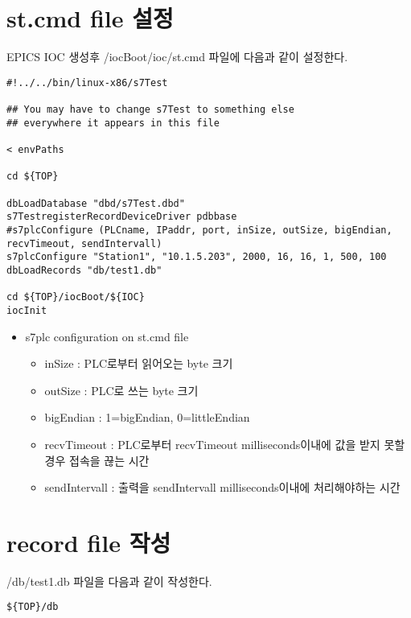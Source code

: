 \documentclass[11pt
  , a4paper
  , article
  , oneside
]{memoir}
\begin{document}
\section{st.cmd file 설정}
EPICS IOC 생성후 /iocBoot/ioc/st.cmd 파일에 다음과 같이 설정한다.

\begin{lstlisting}[style=termstyle]
#!../../bin/linux-x86/s7Test

## You may have to change s7Test to something else
## everywhere it appears in this file

< envPaths

cd ${TOP}

dbLoadDatabase "dbd/s7Test.dbd"
s7TestregisterRecordDeviceDriver pdbbase
#s7plcConfigure (PLCname, IPaddr, port, inSize, outSize, bigEndian, recvTimeout, sendIntervall) 
s7plcConfigure "Station1", "10.1.5.203", 2000, 16, 16, 1, 500, 100
dbLoadRecords "db/test1.db"

cd ${TOP}/iocBoot/${IOC}
iocInit
\end{lstlisting}
\begin{itemize}
\item s7plc configuration on st.cmd file
\begin{itemize}
\item inSize        : PLC로부터 읽어오는 byte 크기
\item outSize       : PLC로 쓰는 byte 크기
\item bigEndian     : 1=bigEndian, 0=littleEndian
\item recvTimeout   : PLC로부터 recvTimeout milliseconds이내에 값을 받지 못할 경우 접속을 끊는 시간
\item sendIntervall : 출력을 sendIntervall milliseconds이내에 처리해야하는 시간
\end{itemize}
\end{itemize}

\section{record file 작성}
/db/test1.db 파일을 다음과 같이 작성한다.
 
 
\begin{lstlisting}[style=termstyle]
 ${TOP}/db
\end{lstlisting}
\end{document}
